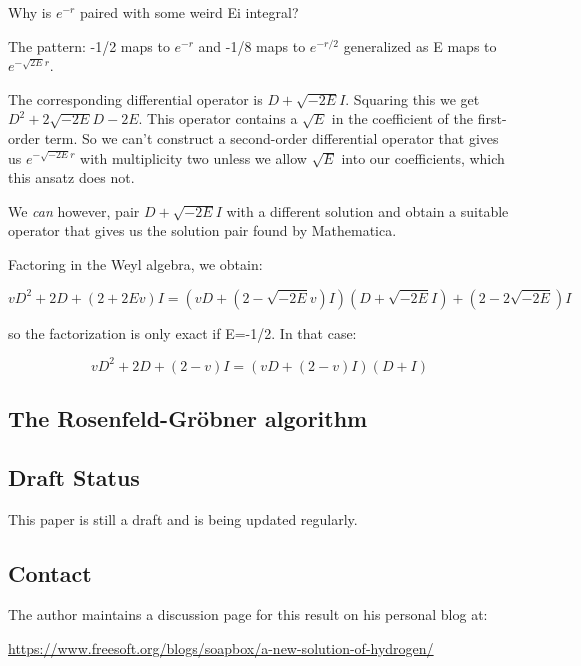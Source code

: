 \documentclass{article}
\begin{document}
Why is $e^{-r}$ paired with some weird Ei integral?

The pattern: -1/2 maps to $e^{-r}$ and -1/8 maps to $e^{-r/2}$ generalized as E maps to $e^{-\sqrt{2E}r}$.

The corresponding differential operator is $D+\sqrt{-2E}I$.  Squaring this we get $D^2 + 2\sqrt{-2E}D - 2E$.
This operator contains a $\sqrt{E}$ in the coefficient of the first-order term.  So we can't construct
a second-order differential operator that gives us $e^{-\sqrt{-2E}r}$ with multiplicity two unless we
allow $\sqrt{E}$ into our coefficients, which this ansatz does not.

We {\it can} however, pair $D+\sqrt{-2E}I$ with a different solution and obtain a suitable operator
that gives us the solution pair found by Mathematica.

Factoring in the Weyl algebra, we obtain:

\begin{equation}
vD^2 + 2D + (2+2Ev) I = (vD + (2-\sqrt{-2E}v)I) (D+\sqrt{-2E}I) + (2-2\sqrt{-2E})I
\end{equation}

so the factorization is only exact if E=-1/2.  In that case:

\begin{equation}
vD^2 + 2D + (2-v) I = (vD + (2-v)I) (D+I)
\end{equation}

\subsection*{The Rosenfeld-Gr\"obner algorithm}

\subsection*{Draft Status}

This paper is still a draft and is being updated regularly.

\subsection*{Contact}

The author maintains a discussion page for this result on his personal blog at:

\begin{center}
\small
\url{https://www.freesoft.org/blogs/soapbox/a-new-solution-of-hydrogen/}
\end{center}
\end{document}
